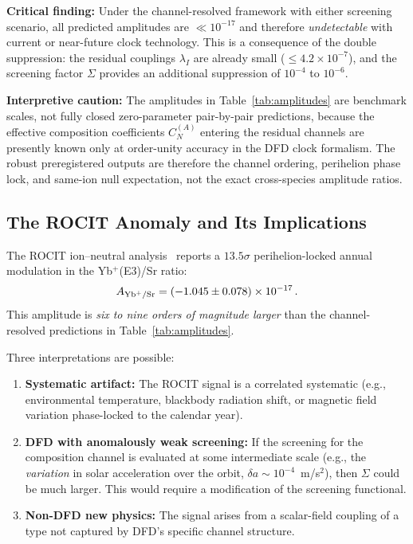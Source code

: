 \documentclass[twocolumn,showpacs,preprintnumbers,amsmath,amssymb,prd]{revtex4-2}
\begin{document}
\textbf{Critical finding:} Under the channel-resolved framework
with either screening scenario, all predicted amplitudes are
$\ll 10^{-17}$ and therefore \emph{undetectable} with current or
near-future clock technology.  This is a consequence of the double
suppression: the residual couplings $\lambda_I$ are already small
($\leq 4.2 \times 10^{-7}$), and the screening factor $\Sigma$
provides an additional suppression of $10^{-4}$ to $10^{-6}$.

\textbf{Interpretive caution:} The amplitudes in
Table~\ref{tab:amplitudes} are benchmark scales, not fully closed
zero-parameter pair-by-pair predictions, because the effective
composition coefficients $C_N^{(A)}$ entering the residual channels
are presently known only at order-unity accuracy in the DFD clock
formalism.  The robust preregistered outputs are therefore the
channel ordering, perihelion phase lock, and same-ion null
expectation, not the exact cross-species amplitude ratios.

\subsection{The ROCIT Anomaly and Its Implications}
\label{sec:rocit}

The ROCIT ion--neutral analysis~\cite{Alcock2025_ROCIT} reports a
$13.5\sigma$ perihelion-locked annual modulation in the
Yb$^+$(E3)/Sr ratio:
\begin{equation}\label{eq:rocit}
A_{\rm Yb^+/Sr} = (-1.045 \pm 0.078) \times 10^{-17}\,.
\end{equation}
This amplitude is \emph{six to nine orders of magnitude larger}
than the channel-resolved predictions in Table~\ref{tab:amplitudes}.

Three interpretations are possible:
\begin{enumerate}
\item \textbf{Systematic artifact:} The ROCIT signal is a
  correlated systematic (e.g., environmental temperature,
  blackbody radiation shift, or magnetic field variation
  phase-locked to the calendar year).

\item \textbf{DFD with anomalously weak screening:} If the
  screening for the composition channel is evaluated at some
  intermediate scale (e.g., the \emph{variation} in solar
  acceleration over the orbit, $\delta a \sim 10^{-4}$~m/s$^2$),
  then $\Sigma$ could be much larger.  This would require a
  modification of the screening functional.

\item \textbf{Non-DFD new physics:} The signal arises from a
  scalar-field coupling of a type not captured by DFD's
  specific channel structure.
\end{enumerate}
\end{document}
